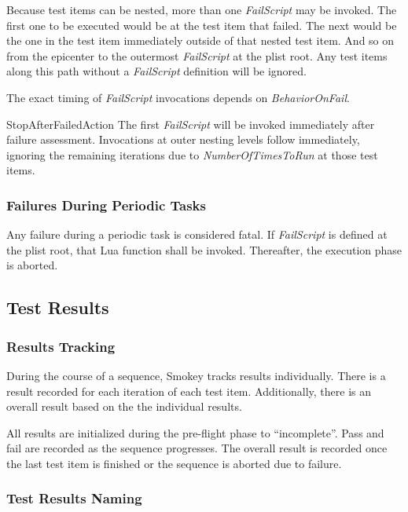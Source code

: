 \documentclass[11pt]{article}
\newcommand{\prop}[1]{{\itshape#1}}
\begin{document}
Because test items can be nested, more than one \prop{FailScript} may be invoked.  The
first one to be executed would be at the test item that failed.  The next would
be the one in the test item immediately outside of that nested test item.  And
so on from the epicenter to the outermost \prop{FailScript} at the plist root.  Any
test items  along this path without a \prop{FailScript} definition will be ignored.

The exact timing of \prop{FailScript} invocations depends on \prop{BehaviorOnFail}.

\begin{Definition}

\item[StopAfterFailedAction] The first \prop{FailScript} will be invoked immediately
	after failure assessment.  Invocations at outer nesting levels follow
	immediately, ignoring the remaining iterations due to
	\prop{NumberOfTimesToRun} at those test items.

\end{Definition}

\subsubsection{Failures During Periodic Tasks}

Any failure during a periodic task is considered fatal.  If \prop{FailScript} is
defined at the plist root, that Lua function shall be invoked.  Thereafter, the
execution phase is aborted.

\subsection{Test Results}

\subsubsection{Results Tracking}

During the course of a sequence, Smokey tracks results individually.  There is
a result recorded for each iteration of each test item.  Additionally, there is
an overall result based on the the individual results. 

All results are initialized during the pre-flight phase to ``incomplete''.  Pass
and fail are recorded as the sequence progresses.  The overall result is
recorded once the last test item is finished or the sequence is aborted due to
failure.

\subsubsection{Test Results Naming}
\end{document}
